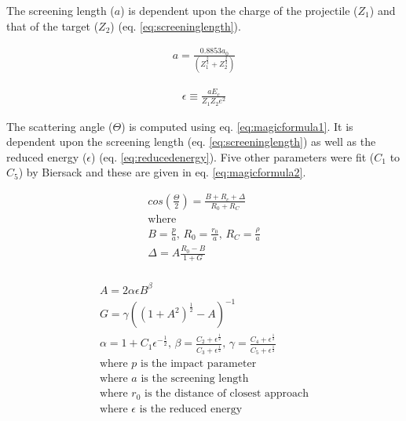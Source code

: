 The screening length ($a$) is dependent upon the charge of the projectile ($Z_1$) and that of the target ($Z_2$) (eq. \ref{eq:screeninglength}).

\begin{equation}
\begin{split}
a = \frac{0.8853 a_0}{\left(Z_1^{\frac{2}{3}} + Z_2^{\frac{2}{3}}\right)}
\end{split}
\label{eq:screeninglength}
\end{equation}

\begin{equation}
\begin{split}
\epsilon \equiv \frac{a E_c}{Z_1 Z_2 e^{2}}
\end{split}
\label{eq:reducedenergy}
\end{equation}

The scattering angle ($\Theta$) is computed using eq. \ref{eq:magicformula1}.  It is dependent upon the screening length (eq. \ref{eq:screeninglength}) as well as the reduced energy ($\epsilon$) (eq. \ref{eq:reducedenergy}).  Five other parameters were fit ($C_1$ to $C_5$) by Biersack and these are given in eq. \ref{eq:magicformula2}.

\begin{equation}
\begin{split}
cos \left(\frac{\Theta}{2}\right) = \frac{B + R_c + \Delta}{R_0 + R_C} \\
\text{where } \\
B = \frac{p}{a} \text{,    }  R_0 = \frac{r_0}{a} \text{,    }  R_C = \frac{\rho}{a} \\
\Delta = A \frac{R_0 - B}{1 + G} \\
\end{split}
\label{eq:magicformula1}
\end{equation}

\begin{equation}
\begin{split}
A = 2 \alpha \epsilon B^\beta \\
G = \gamma \left(\left(1+A^2\right)^{\frac{1}{2}}-A\right)^{-1} \\
\alpha = 1 + C_1 \epsilon^{-\frac{1}{2}} \text{,    } \beta = \frac{C_2 + \epsilon^{\frac{1}{2}}}{C_3 + \epsilon^{\frac{1}{2}}} \text{,    } \gamma = \frac{C_4 + \epsilon^{\frac{1}{2}}}{C_5 + \epsilon^{\frac{1}{2}}} \\
\text{where } p \text{ is the impact parameter} \\
\text{where } a \text{ is the screening length} \\
\text{where } r_0 \text{ is the distance of closest approach} \\
\text{where } \epsilon \text{ is the reduced energy} 
\end{split}
\label{eq:magicformula2}
\end{equation}

